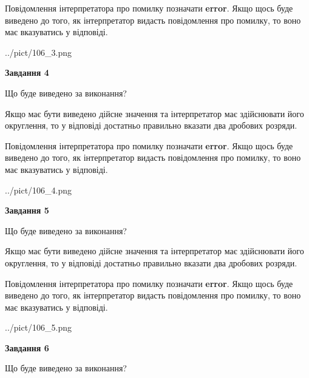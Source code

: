 \documentclass[12pt, ukrainian]{article}
\begin{document}
{\begin {Large}
Повідомлення інтерпретатора про помилку позначати \textbf{error}.
Якщо щось буде виведено до того, як інтерпретатор видасть повідомлення про помилку, 
то воно має вказуватись у відповіді. \par

\begin{center}
	{../pict/106_3.png}
\end{center}
\newpage

{\begin {center}\textbf{Завдання 4}\end {center}}\par
Що буде виведено за виконання? \par

Якщо має бути виведено дійсне значення та інтерпретатор має здійснювати його округлення, 
то у відповіді достатньо правильно вказати два дробових розряди.

Повідомлення інтерпретатора про помилку позначати \textbf{error}.
Якщо щось буде виведено до того, як інтерпретатор видасть повідомлення про помилку, 
то воно має вказуватись у відповіді. \par

\begin{center}
	{../pict/106_4.png}
\end{center}
\newpage

{\begin {center}\textbf{Завдання 5}\end {center}}\par
Що буде виведено за виконання? \par

Якщо має бути виведено дійсне значення та інтерпретатор має здійснювати його округлення, 
то у відповіді достатньо правильно вказати два дробових розряди.

Повідомлення інтерпретатора про помилку позначати \textbf{error}.
Якщо щось буде виведено до того, як інтерпретатор видасть повідомлення про помилку, 
то воно має вказуватись у відповіді. \par

\begin{center}
	{../pict/106_5.png}
\end{center}
\newpage

{\begin {center}\textbf{Завдання 6}\end {center}}\par
Що буде виведено за виконання? \par


\end{Large}}
\end{document}
